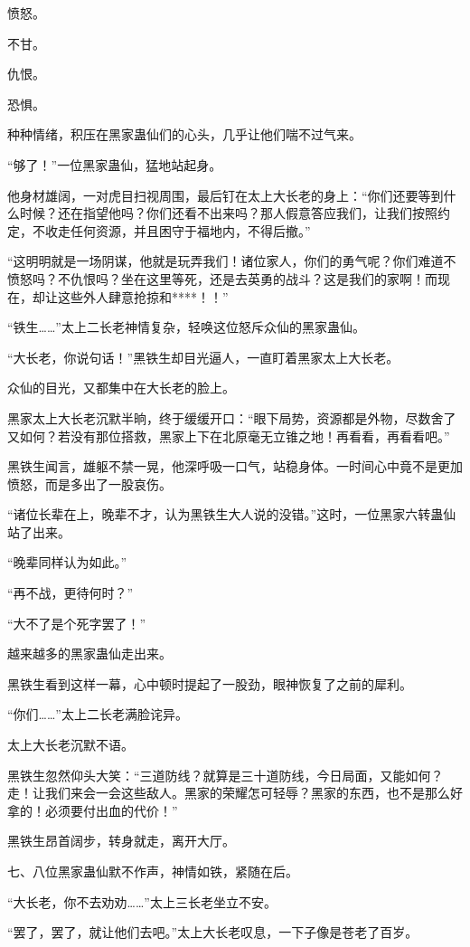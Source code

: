 \begin{this_body}
愤怒。

不甘。

仇恨。

恐惧。

种种情绪，积压在黑家蛊仙们的心头，几乎让他们喘不过气来。

“够了！”一位黑家蛊仙，猛地站起身。

他身材雄阔，一对虎目扫视周围，最后钉在太上大长老的身上：“你们还要等到什么时候？还在指望他吗？你们还看不出来吗？那人假意答应我们，让我们按照约定，不收走任何资源，并且困守于福地内，不得后撤。”

“这明明就是一场阴谋，他就是玩弄我们！诸位家人，你们的勇气呢？你们难道不愤怒吗？不仇恨吗？坐在这里等死，还是去英勇的战斗？这是我们的家啊！而现在，却让这些外人肆意抢掠和****！！”

“铁生……”太上二长老神情复杂，轻唤这位怒斥众仙的黑家蛊仙。

“大长老，你说句话！”黑铁生却目光逼人，一直盯着黑家太上大长老。

众仙的目光，又都集中在大长老的脸上。

黑家太上大长老沉默半晌，终于缓缓开口：“眼下局势，资源都是外物，尽数舍了又如何？若没有那位搭救，黑家上下在北原毫无立锥之地！再看看，再看看吧。”

黑铁生闻言，雄躯不禁一晃，他深呼吸一口气，站稳身体。一时间心中竟不是更加愤怒，而是多出了一股哀伤。

“诸位长辈在上，晚辈不才，认为黑铁生大人说的没错。”这时，一位黑家六转蛊仙站了出来。

“晚辈同样认为如此。”

“再不战，更待何时？”

“大不了是个死字罢了！”

越来越多的黑家蛊仙走出来。

黑铁生看到这样一幕，心中顿时提起了一股劲，眼神恢复了之前的犀利。

“你们……”太上二长老满脸诧异。

太上大长老沉默不语。

黑铁生忽然仰头大笑：“三道防线？就算是三十道防线，今日局面，又能如何？走！让我们来会一会这些敌人。黑家的荣耀怎可轻辱？黑家的东西，也不是那么好拿的！必须要付出血的代价！”

黑铁生昂首阔步，转身就走，离开大厅。

七、八位黑家蛊仙默不作声，神情如铁，紧随在后。

“大长老，你不去劝劝……”太上三长老坐立不安。

“罢了，罢了，就让他们去吧。”太上大长老叹息，一下子像是苍老了百岁。


\end{this_body}
